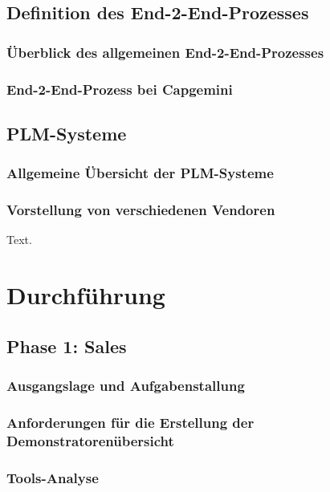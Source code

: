\documentclass[a4paper, 12pt]{scrartcl}
\begin{document}
	\subsection{Definition des End-2-End-Prozesses}
	\subsubsection{Überblick des allgemeinen End-2-End-Prozesses} %
	\subsubsection{End-2-End-Prozess bei Capgemini}
	\subsection{PLM-Systeme}
	\subsubsection{Allgemeine Übersicht der PLM-Systeme}
	\subsubsection{Vorstellung von verschiedenen Vendoren}
	Text.
	\newpage
	\section{Durchführung}
	\subsection{Phase 1: Sales} 
	\subsubsection{Ausgangslage und Aufgabenstallung} %
	\subsubsection{Anforderungen für die Erstellung der Demonstratorenübersicht} %
	\subsubsection{Tools-Analyse}%
\end{document}

